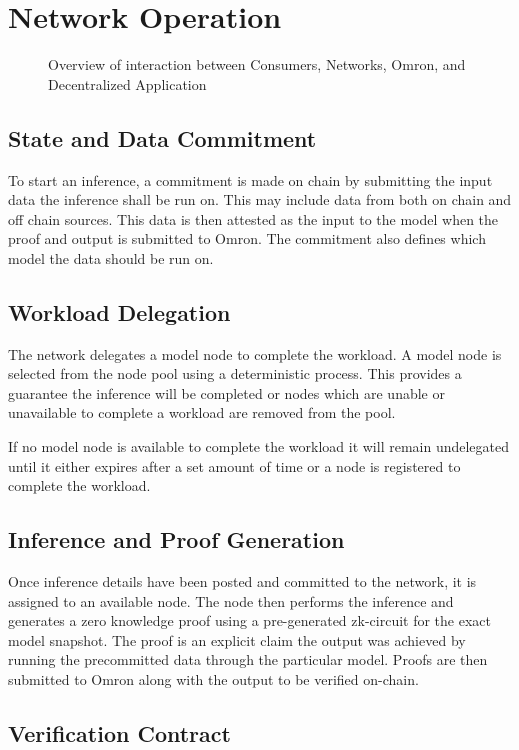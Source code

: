 \documentclass[conference]{IEEEtran}
\begin{document}
\section{Network Operation}
\begin{figure}[!ht]
    \centering
    
    \caption{Overview of interaction between Consumers, Networks, Omron, and Decentralized Application}
    \label{fig:Fig 8}
\end{figure}
\subsection{State and Data Commitment}
To start an inference, a commitment is made on chain by submitting the input data the inference shall be run on. This may include data from both on chain and off chain sources. This data is then attested as the input to the model when the proof and output is submitted to Omron. The commitment also defines which model the data should be run on.

\subsection{Workload Delegation}
The network delegates a model node to complete the workload. A model node is selected from the node pool using a deterministic process. This provides a guarantee the inference will be completed or nodes which are unable or unavailable to complete a workload are removed from the pool.

If no model node is available to complete the workload it will remain undelegated until it either expires after a set amount of time or a node is registered to complete the workload.

\subsection{Inference and Proof Generation}
Once inference details have been posted and committed to the network, it is assigned to an available node. The node then performs the inference and generates a zero knowledge proof using a pre-generated zk-circuit for the exact model snapshot. The proof is an explicit claim the output was achieved by running the precommitted data through the particular model. Proofs are then submitted to Omron along with the output to be verified on-chain.

\subsection{Verification Contract}
\end{document}
